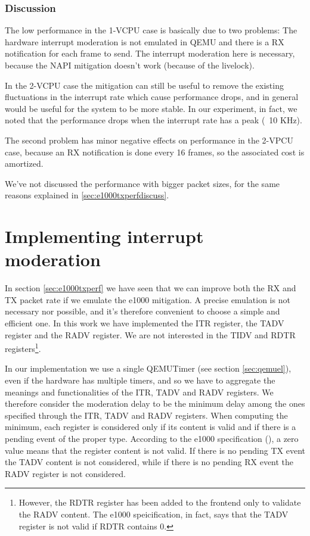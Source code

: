 \subsubsection{Discussion}
The low performance in the 1-VCPU case is basically due to two problems: The hardware interrupt moderation is not emulated in QEMU and
there is a RX notification for each frame to send. The interrupt moderation here is necessary, because the NAPI mitigation doesn't work
(because of the livelock).

In the 2-VCPU case the mitigation can still be useful to remove the existing fluctuations in the interrupt rate which cause performance
drops, and in general would be useful for the system to be more stable. In our experiment, in fact, we noted that the performance drops
when the interrupt rate has a peak (~10 KHz).

The second problem has minor negative effects on performance in the 2-VPCU case, because an RX notification is done every
16 frames, so the associated cost is amortized.

\vspace{0.5cm}

We've not discussed the performance with bigger packet sizes, for the same reasons explained in \ref{sec:e1000txperfdiscuss}.



\section{Implementing interrupt moderation}
\label{sec:e1000-mit}
In section \ref{sec:e1000txperf} we have seen that we can improve both the RX and TX packet rate if we emulate the e1000 mitigation.
A precise emulation is not necessary nor possible, and it's therefore convenient to choose a simple and efficient one.
In this work we have implemented the ITR register, the TADV register and the RADV register.
We are not interested in the TIDV and RDTR registers\footnote{However, the RDTR register has been added to the frontend only to 
validate the RADV content. The e1000 speicification, in fact, says that the TADV register is not valid if RDTR contains 0.}.

\vspace{0.5cm}

In our implementation we use a single QEMUTimer (see section \ref{sec:qemuel}), even if the hardware has multiple timers, and so we have to 
aggregate the meanings and functionalities of the ITR, TADV and RADV registers.
We therefore consider the moderation delay to be the minimum delay among the ones specified through the ITR, TADV and RADV registers.
When computing the minimum, each register is considered only if its content is valid and if there is a pending event of the proper type.
According to the e1000 specification (\cite{ref:e1000}), a zero value means that the register content is not valid. If there is no pending 
TX event the TADV content is not considered, while if there is no pending RX event the RADV register is not considered.

